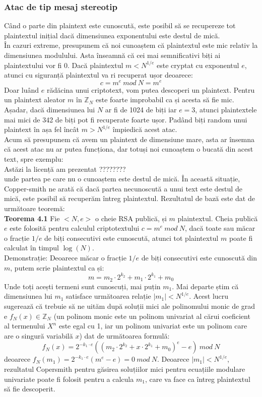 \documentclass[12]{report}
\begin{document}
\subsubsection{Atac de tip mesaj stereotip}
Când o parte din plaintext este cunoscută, este posibil să se recupereze tot plaintextul inițial dacă dimensiunea exponentului este destul de mică. \\
În cazuri extreme, presupunem că noi cunoaștem că plaintextul este mic relativ la dimensiunea modulului. Asta înseamnă că cei mai semnificativi biți ai plaintextului vor fi 0. Dacă plaintextul $m < N^{1/e}$ este cryptat cu exponentul $e$, atunci cu siguranță plaintextul va ri recuperat ușor deoarece:
$$ c = m^e \ mod \ N = m^e$$
Doar luând $e$ rădăcina unui criptotext, vom putea descoperi un plaintext. Pentru un plaintext aleator $m$ în $\mathbb{Z}_N$ este foarte improbabil ca și acesta să fie mic. \\
Așadar, dacă dimensiunea lui $N$ ar fi de 1024 de biți iar $e=3$, atunci plaintextele mai mici de 342 de biți pot fi recuperate foarte ușor. Padând biți random unui plaintext în așa fel încât $m > N^{1/e}$ împiedică acest atac. \\
Acum să presupunem că avem un plaintext de dimensiune mare, asta ar însemna că acest atac nu ar putea funcționa, dar totuși noi cunoaștem o bucată din acest text, spre exemplu: \\
Astăzi la licență am prezentat ???????? \\
unde partea pe care nu o cunoaștem este destul de mică. În această situație, Copper-smith \cite{cooper} \cite{cooper2} ne arată că dacă partea necunoscută a unui text este destul de mică, este posibil să recuperăm întreg plaintextul. Rezultatul de bază este dat de următoare teoremă: \\
\textbf{Teorema 4.1}
Fie $<N,e>$ o cheie RSA publică, și $m$ plaintextul. Cheia publică $e$ este folosită pentru calculul criptotextului $c = m^e \ mod \ N$, dacă toate sau măcar o fracție $1/e$ de biți consecutivi este cunoscută, atunci tot plaintextul $m$ poate fi calculat în timpul $\log(N)$. \\
Demonstrație: Deoarece măcar o fracție $1/e$ de biți consecutivi este cunoscută din $m$, putem scrie plaintextul ca și:
$$ m= m_{2}^{} \cdot   2^{k_2} + m_1 \cdot   2^{k_1} + m_0$$
Unde toți acești termeni sunt cunoscuți, mai puțin $m_1$. Mai departe știm  că dimensiunea lui $m_1$ satisface următoarea relație $ |m_1| < N^{1/e}$. Acest lucru sugerează că trebuie să ne uităm după soluții mici ale polinomului monic de grad e $f_N(x) \in \mathbb{Z}_N $ (un polinom monic este un polinom univariat al cărui coeficient al termenului $X^n$ este egal cu 1, iar un polinom univariat este un polinom care are o singură variabilă $x$) dat de următoarea formulă:
$$ f_N(x) = 2^{-k_1 \cdot   e}((m_2 \cdot   2^{k_2} + x \cdot 2^{k_1} + m_0)^e - e) \ mod \ N$$
deoarece $f_N(m_1)= 2^{-k_1  \cdot e}(m^e-e)=0 \ mod \ N$. Deoarece $ |m_1| < N^{1/e}$, rezultatul Copersmith pentru găsirea soluțiilor mici pentru ecuațiile modulare univariate poate fi folosit pentru a calcula $m_1$, care va face ca întreg plaintextul să fie descoperit. 
\end{document}
